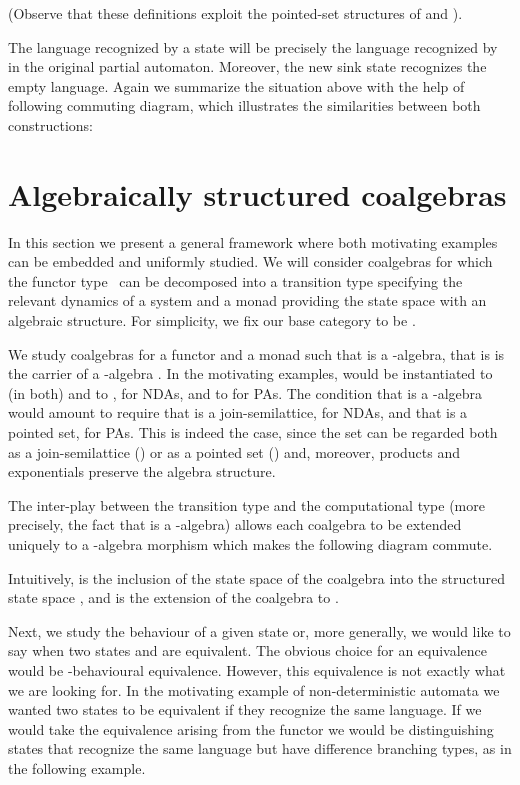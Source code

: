 \documentclass{LMCS}
\begin{document}
(Observe that these definitions exploit the pointed-set structures of  and ).

The language  recognized by a state  will be precisely the
language recognized by  in the original partial automaton.
Moreover, the new sink state recognizes the empty language. Again we
summarize the situation above with the help of following commuting
diagram, which illustrates the similarities between both
constructions:

\section{Algebraically structured coalgebras}\label{sec:general}

In this section we present a general framework where both motivating
examples can be embedded and uniformly studied. We will consider
coalgebras for which the functor type~ can be decomposed into a
transition type  specifying the relevant dynamics of a system and
a monad  providing the state space with an algebraic structure.
For simplicity, we fix our base category to be .



We study coalgebras  for a functor  and a
monad  such that  is a -algebra, that is  is the carrier of a -algebra
. In the motivating examples,  would be instantiated to
 (in both) and  to , for NDAs, and to  for
PAs. The condition that  is a -algebra would amount to
require that  is a join-semilattice, for NDAs, and
that  is a pointed set, for PAs. This is indeed the
case, since the set  can be regarded both as a join-semilattice
() or as a pointed set () and, moreover,
products and exponentials preserve the algebra structure.

The inter-play between the transition type  and the
computational type  (more precisely, the fact that  is a -algebra) allows each coalgebra  to be extended uniquely to a -algebra
morphism  which
makes the following diagram commute.

Intuitively,  is the
inclusion of the state space of the coalgebra  into the structured state space , and  is the extension of the coalgebra  to .

Next, we study the behaviour of a given state or, more
generally, we would like to say when two states  and  are
equivalent. The obvious choice for an equivalence would be
-behavioural equivalence. However, this equivalence is not
exactly what we are looking for. In the motivating example of
non-deterministic automata we wanted two states to be equivalent if
they recognize the same language. If we would take the equivalence
arising from the functor  we would be
distinguishing states that recognize the same language but have
difference branching types, as in the following example.
\end{document}
